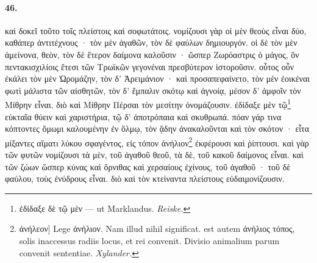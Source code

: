 \documentclass[a4paper, 11pt, oneside, polutonikogreek, german]{article}
\begin{document}
\paragraph{46.}
καὶ δοκεῖ τοῦτο τοῖς πλείστοις καὶ σοφωτάτοις. νομίζουσι γὰρ οἱ μὲν θεοὺς εἶναι δύο, καθάπερ ἀντιτέχνους · τὸν μὲν ἀγαθῶν, τὸν δὲ φαύλων δημιουργόν. οἱ δὲ τὸν μὲν ἀμείνονα, θεὸν, τὸν δὲ ἕτερον δαίμονα καλοῦσιν · ὥσπερ Ζωρόαστρις ὁ μάγος, ὃν πεντακισχιλίοις ἔτεσι τῶν Τρωϊκῶν γεγονέναι πρεσβύτερον ἱστοροῦσιν. οὗτος οὖν ἐκάλει τὸν μὲν Ὡρομάζην, τὸν δ' Ἀρειμάνιον · καὶ προσαπεφαίνετο, τὸν μὲν ἐοικέναι φωτὶ μάλιστα τῶν αἰσθητῶν, τὸν δ' ἔμπαλιν σκότῳ καὶ ἀγνοίᾳ, μέσον δ' ἀμφοῖν τὸν Μίθρην εἶναι. διὸ καὶ Μίθρην Πέρσαι τὸν μεσίτην ὀνομάζουσιν. ἐδίδαξε μὲν τῷ\footnote{ἐδίδαξε δὲ τῷ μὲν --- ut Marklandus. \emph{Reiske.}} εὐκταῖα θύειν καὶ χαριστήρια, τῷ δ' ἀποτρόπαια καὶ σκυθρωπά. πόαν γάρ τινα κόπτοντες ὅμωμι καλουμένην ἐν ὅλμῳ, τὸν ᾅδην ἀνακαλοῦνται καὶ τὸν σκότον · εἶτα μίξαντες αἵματι λύκου σφαγέντος, εἰς τόπον ἀνήλιον\footnote{ἀνήλεον] Lege ἀνήλιον. Nam illud nihil significat. est autem ἀνήλιος τόπος, solis inaccessus radiis locus, et rei convenit. Divisio animalium parum convenit sententiae. \emph{Xylander.}} ἐκφέρουσι καὶ ῥίπτουσι. καὶ γὰρ τῶν φυτῶν νομίζουσι τὰ μὲν, τοῦ ἀγαθοῦ θεοῦ, τὰ δὲ, τοῦ κακοῦ δαίμονος εἶναι. καὶ τῶν ζώων ὥσπερ κύνας καὶ ὄρνιθας καὶ χερσαίους ἐχίνους, τοῦ ἀγαθοῦ · τοῦ δὲ φαύλου, τοὺς ἐνύδρους εἶναι. διὸ καὶ τὸν κτείναντα πλείστους εὐδαιμονίζουσιν.
\end{document}
